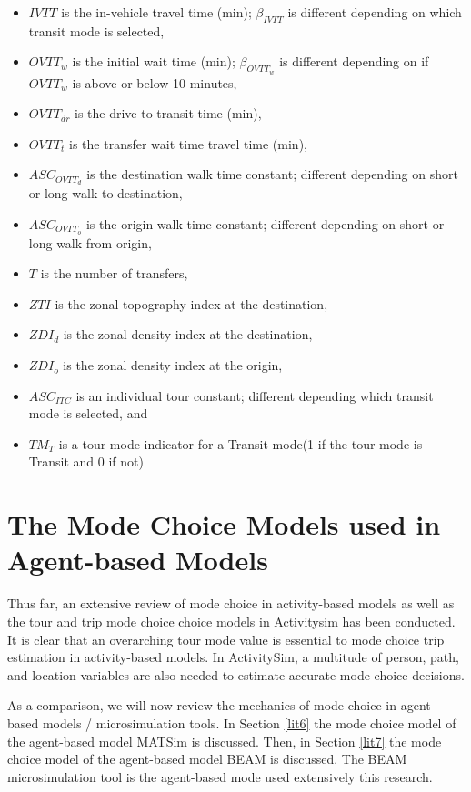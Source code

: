\documentclass[12pt, oneside, openright]{byuthesis}
\providecommand{\tightlist}{%
  \setlength{\itemsep}{0pt}\setlength{\parskip}{0pt}}
\begin{document}
\begin{itemize}
\tightlist
\item
  \(IVTT\) is the in-vehicle travel time (min); \(\beta_{IVTT}\) is different depending on which transit mode is selected,
\item
  \(OVTT_w\) is the initial wait time (min); \(\beta_{OVTT_w}\) is different depending on if \(OVTT_w\) is above or below 10 minutes,
\item
  \(OVTT_{dr}\) is the drive to transit time (min),
\item
  \(OVTT_t\) is the transfer wait time travel time (min),\\
\item
  \(ASC_{OVTT_d}\) is the destination walk time constant; different depending on short or long walk to destination,
\item
  \(ASC_{OVTT_o}\) is the origin walk time constant; different depending on short or long walk from origin,
\item
  \(T\) is the number of transfers,
\item
  \(ZTI\) is the zonal topography index at the destination,
\item
  \(ZDI_d\) is the zonal density index at the destination,
\item
  \(ZDI_o\) is the zonal density index at the origin,
\item
  \(ASC_{ITC}\) is an individual tour constant; different depending which transit mode is selected, and
\item
  \(TM_{T}\) is a tour mode indicator for a Transit mode(1 if the tour mode is Transit and 0 if not)
\end{itemize}

\hypertarget{lit5}{%
\section{The Mode Choice Models used in Agent-based Models}\label{lit5}}

Thus far, an extensive review of mode choice in activity-based models as well as the tour and trip mode choice choice models in Activitysim has been conducted. It is clear that an overarching tour mode value is essential to mode choice trip estimation in activity-based models. In ActivitySim, a multitude of person, path, and location variables are also needed to estimate accurate mode choice decisions.

As a comparison, we will now review the mechanics of mode choice in agent-based models / microsimulation tools. In Section \ref{lit6} the mode choice model of the agent-based model MATSim is discussed. Then, in Section \ref{lit7} the mode choice model of the agent-based model BEAM is discussed. The BEAM microsimulation tool is the agent-based mode used extensively this research.
\end{document}
